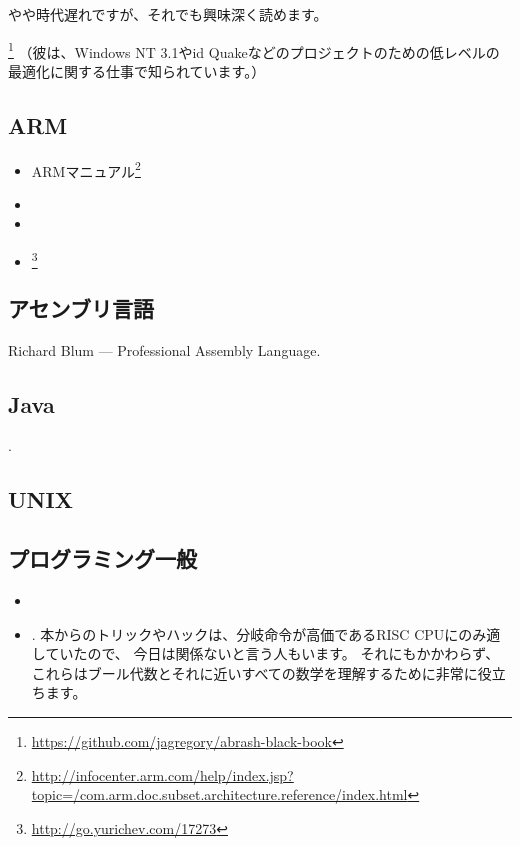 やや時代遅れですが、それでも興味深く読めます。

\MAbrash\footnote{\AlsoAvailableAs \url{https://github.com/jagregory/abrash-black-book}}
（彼は、Windows NT 3.1やid Quakeなどのプロジェクトのための低レベルの最適化に関する仕事で知られています。）

\subsection{ARM}

\begin{itemize}
\item ARMマニュアル\footnote{\AlsoAvailableAs \url{http://infocenter.arm.com/help/index.jsp?topic=/com.arm.doc.subset.architecture.reference/index.html}}

\item \ARMSevenRef

\item \ARMSixFourRefURL

\item \ARMCookBook\footnote{\AlsoAvailableAs \url{http://go.yurichev.com/17273}}
\end{itemize}

\subsection{アセンブリ言語}

Richard Blum --- Professional Assembly Language.

\subsection{Java}

\JavaBook.

\subsection{UNIX}

\TAOUP

\subsection{プログラミング一般}

\begin{itemize}

\item \RobPikePractice

\item \HenryWarren.
本からのトリックやハックは、分岐命令が高価である\ac{RISC} \ac{CPU}にのみ適していたので、
今日は関係ないと言う人もいます。 
それにもかかわらず、これらはブール代数とそれに近いすべての数学を理解するために非常に役立ちます。

\end{itemize}


